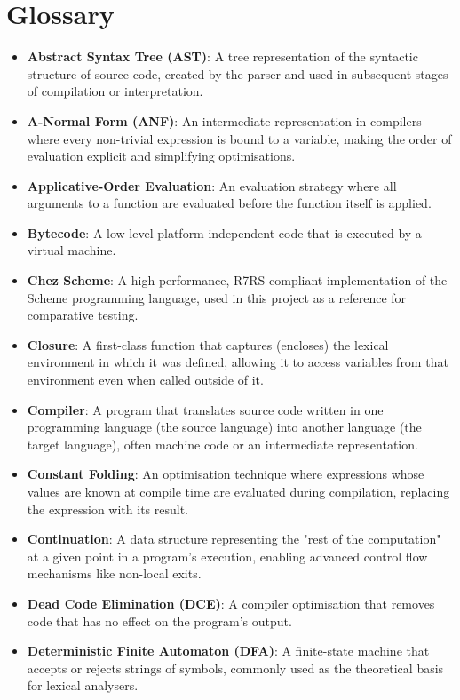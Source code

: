 \documentclass[final]{cmpreport_02}
\begin{document}
\section{Glossary}
\label{Glossary}
\begin{itemize}
    \item \textbf{Abstract Syntax Tree (AST)}: A tree representation of the syntactic structure of source code, created by the parser and used in subsequent stages of compilation or interpretation.
    \item \textbf{A-Normal Form (ANF)}: An intermediate representation in compilers where every non-trivial expression is bound to a variable, making the order of evaluation explicit and simplifying optimisations.
    \item \textbf{Applicative-Order Evaluation}: An evaluation strategy where all arguments to a function are evaluated before the function itself is applied.
    \item \textbf{Bytecode}: A low-level platform-independent code that is executed by a virtual machine.
    \item \textbf{Chez Scheme}: A high-performance, R7RS-compliant implementation of the Scheme programming language, used in this project as a reference for comparative testing.
    \item \textbf{Closure}: A first-class function that captures (encloses) the lexical environment in which it was defined, allowing it to access variables from that environment even when called outside of it.
    \item \textbf{Compiler}: A program that translates source code written in one programming language (the source language) into another language (the target language), often machine code or an intermediate representation.
    \item \textbf{Constant Folding}: An optimisation technique where expressions whose values are known at compile time are evaluated during compilation, replacing the expression with its result.
    \item \textbf{Continuation}: A data structure representing the "rest of the computation" at a given point in a program's execution, enabling advanced control flow mechanisms like non-local exits.
    \item \textbf{Dead Code Elimination (DCE)}: A compiler optimisation that removes code that has no effect on the program's output.
    \item \textbf{Deterministic Finite Automaton (DFA)}: A finite-state machine that accepts or rejects strings of symbols, commonly used as the theoretical basis for lexical analysers.

\end{itemize}
\end{document}
